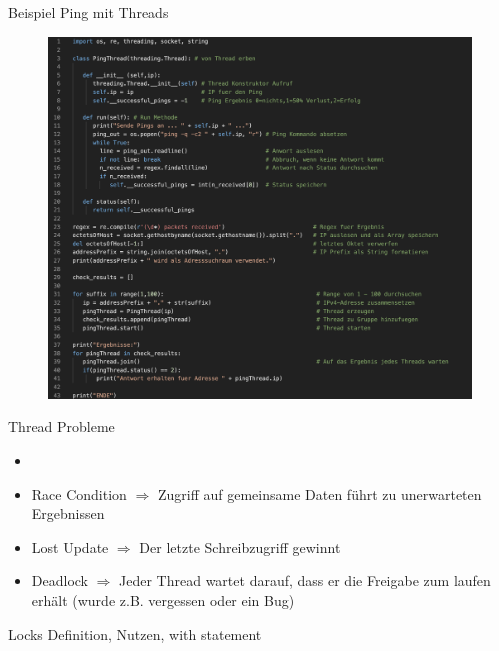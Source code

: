\begin{frame}{Beispiel Ping mit Threads}
    \begin{figure}[!htb]
        \includegraphics[scale=0.23]{6-python3/img/pingthreads}
    \end{figure}

\end{frame}

\begin{frame}{Thread Probleme}
         \begin{itemize}
        \setlength{\itemindent}{2.2in}
        \item [\textbf{Probleme beim Umgang mit Threads}]
    \end{itemize}
    \begin{itemize}
        \item Race Condition  $\Rightarrow$  Zugriff auf gemeinsame Daten führt   zu unerwarteten Ergebnissen
        \item Lost Update $\Rightarrow$  Der letzte Schreibzugriff gewinnt
        \item Deadlock $\Rightarrow$  Jeder Thread wartet darauf, dass er die Freigabe zum laufen erhält (wurde z.B. vergessen oder ein Bug)
    \end{itemize}
\end{frame}

\begin{frame}{Locks}
   Definition, Nutzen, with statement
\end{frame}


